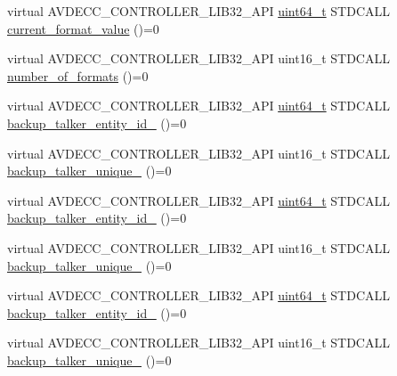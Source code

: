 \begin{DoxyCompactItemize}
\item 
virtual A\+V\+D\+E\+C\+C\+\_\+\+C\+O\+N\+T\+R\+O\+L\+L\+E\+R\+\_\+\+L\+I\+B32\+\_\+\+A\+PI \hyperlink{parse_8c_aec6fcb673ff035718c238c8c9d544c47}{uint64\+\_\+t} S\+T\+D\+C\+A\+LL \hyperlink{classavdecc__lib_1_1stream__input__descriptor__response_a6fded21e06a52c7031a0ce0b6f306ca0}{current\+\_\+format\+\_\+value} ()=0
\item 
virtual A\+V\+D\+E\+C\+C\+\_\+\+C\+O\+N\+T\+R\+O\+L\+L\+E\+R\+\_\+\+L\+I\+B32\+\_\+\+A\+PI uint16\+\_\+t S\+T\+D\+C\+A\+LL \hyperlink{classavdecc__lib_1_1stream__input__descriptor__response_a55d221ca29bf6acce7d7031b811bae01}{number\+\_\+of\+\_\+formats} ()=0
\item 
virtual A\+V\+D\+E\+C\+C\+\_\+\+C\+O\+N\+T\+R\+O\+L\+L\+E\+R\+\_\+\+L\+I\+B32\+\_\+\+A\+PI \hyperlink{parse_8c_aec6fcb673ff035718c238c8c9d544c47}{uint64\+\_\+t} S\+T\+D\+C\+A\+LL \hyperlink{classavdecc__lib_1_1stream__input__descriptor__response_acd4fa01e575dfb7160afc66a7cdffcc6}{backup\+\_\+talker\+\_\+entity\+\_\+id\+\_} ()=0
\item 
virtual A\+V\+D\+E\+C\+C\+\_\+\+C\+O\+N\+T\+R\+O\+L\+L\+E\+R\+\_\+\+L\+I\+B32\+\_\+\+A\+PI uint16\+\_\+t S\+T\+D\+C\+A\+LL \hyperlink{classavdecc__lib_1_1stream__input__descriptor__response_acae31dc43b38d6c49acb2db4c8c23b8c}{backup\+\_\+talker\+\_\+unique\+\_} ()=0
\item 
virtual A\+V\+D\+E\+C\+C\+\_\+\+C\+O\+N\+T\+R\+O\+L\+L\+E\+R\+\_\+\+L\+I\+B32\+\_\+\+A\+PI \hyperlink{parse_8c_aec6fcb673ff035718c238c8c9d544c47}{uint64\+\_\+t} S\+T\+D\+C\+A\+LL \hyperlink{classavdecc__lib_1_1stream__input__descriptor__response_af3e6b600303fa7833e2033ee228c751a}{backup\+\_\+talker\+\_\+entity\+\_\+id\+\_} ()=0
\item 
virtual A\+V\+D\+E\+C\+C\+\_\+\+C\+O\+N\+T\+R\+O\+L\+L\+E\+R\+\_\+\+L\+I\+B32\+\_\+\+A\+PI uint16\+\_\+t S\+T\+D\+C\+A\+LL \hyperlink{classavdecc__lib_1_1stream__input__descriptor__response_a99963ab0e34ebf72203e8d20e8de1ab1}{backup\+\_\+talker\+\_\+unique\+\_} ()=0
\item 
virtual A\+V\+D\+E\+C\+C\+\_\+\+C\+O\+N\+T\+R\+O\+L\+L\+E\+R\+\_\+\+L\+I\+B32\+\_\+\+A\+PI \hyperlink{parse_8c_aec6fcb673ff035718c238c8c9d544c47}{uint64\+\_\+t} S\+T\+D\+C\+A\+LL \hyperlink{classavdecc__lib_1_1stream__input__descriptor__response_a76daa1a16a93fd2abd3613bea816af5f}{backup\+\_\+talker\+\_\+entity\+\_\+id\+\_} ()=0
\item 
virtual A\+V\+D\+E\+C\+C\+\_\+\+C\+O\+N\+T\+R\+O\+L\+L\+E\+R\+\_\+\+L\+I\+B32\+\_\+\+A\+PI uint16\+\_\+t S\+T\+D\+C\+A\+LL \hyperlink{classavdecc__lib_1_1stream__input__descriptor__response_a6c91e59896d8e1d08c3cf676a78caa53}{backup\+\_\+talker\+\_\+unique\+\_} ()=0

\end{DoxyCompactItemize}
